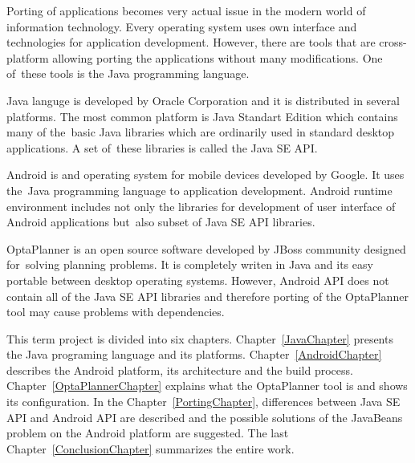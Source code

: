 Porting of applications becomes very actual issue in the modern world of information technology. Every operating system uses own interface and technologies for application development. However, there are tools that are cross-platform allowing porting the applications without many modifications. One of~these tools is the Java programming language.

Java languge is developed by Oracle Corporation and it is distributed in several platforms. The most common platform is Java Standart Edition which contains many of the~basic Java libraries which are ordinarily used in standard desktop applications. A set of~these libraries is called the Java SE API.

Android is and operating system for mobile devices developed by Google. It uses the~Java programming language to application development. Android runtime environment includes not only the libraries for development of user interface of Android applications but~also subset of Java SE API libraries.

OptaPlanner is an open source software developed by JBoss community designed for~solving planning problems. It is completely writen in Java and its easy portable between desktop operating systems. However, Android API does not contain all of the Java SE API libraries and therefore porting of the OptaPlanner tool may cause problems with dependencies.

This term project is divided into six chapters. Chapter~\ref{JavaChapter} presents the Java programing language and its platforms. Chapter~\ref{AndroidChapter} describes the Android platform, its architecture and the build process. Chapter~\ref{OptaPlannerChapter} explains what the OptaPlanner tool is and shows its configuration. In the Chapter~\ref{PortingChapter}, differences between Java SE API and Android API are described and the possible solutions of the JavaBeans problem on the Android platform are suggested. The last Chapter~\ref{ConclusionChapter} summarizes the entire work.

